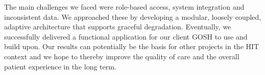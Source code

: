 \documentclass[sigconf]{acmart}
\begin{document}
The main challenges we faced were role-based access, system integration and inconsistent data. We approached these by developing a modular, loosely coupled, adaptive architecture that supports graceful degradation. Eventually, we successfully delivered a functional application for our client GOSH to use and build upon. Our results can potentially be the basis for other projects in the HIT context and we hope to thereby improve the quality of care and the overall patient experience in the long term.


\newpage


%


\end{document}
